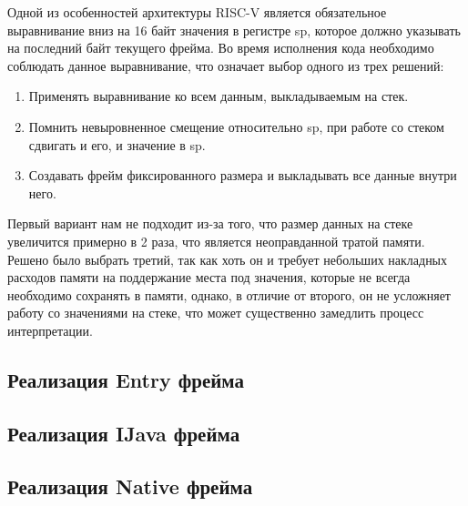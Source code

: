     Одной из особенностей архитектуры RISC-V является обязательное выравнивание вниз на 16 байт значения в регистре sp, которое должно указывать на последний байт текущего фрейма. Во время исполнения кода необходимо соблюдать данное выравнивание, что означает выбор одного из трех решений:
\begin{enumerate}
    \item Применять выравнивание ко всем данным, выкладываемым на стек.
    \item Помнить невыровненное смещение относительно sp, при работе со стеком сдвигать и его, и значение в sp.
    \item Создавать фрейм фиксированного размера и выкладывать все данные внутри него.
\end{enumerate}

Первый вариант нам не подходит из-за того, что размер данных на стеке увеличится примерно в 2 раза, что является неоправданной тратой памяти. Решено было выбрать третий, так как хоть он и требует небольших накладных расходов памяти на поддержание места под значения, которые не всегда необходимо сохранять в памяти, однако, в отличие от второго, он не усложняет работу со значениями на стеке, что может существенно замедлить процесс интерпретации.



\subsection{Реализация Entry фрейма}

\subsection{Реализация IJava фрейма}

\subsection{Реализация Native фрейма}
